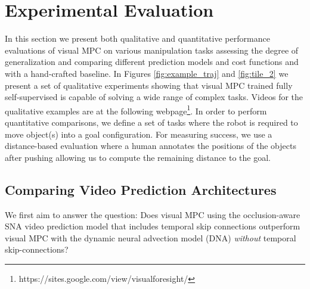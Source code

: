 \section{Experimental Evaluation}
\label{sec:experiments}
In this section we present both qualitative and quantitative  performance evaluations of visual MPC on various manipulation tasks assessing the degree of generalization and comparing different prediction models and cost functions and with a hand-crafted baseline.
In Figures \ref{fig:example_traj} and \ref{fig:tile_2} we present a set of qualitative experiments showing that visual MPC trained fully self-supervised is capable of solving a wide range of complex tasks.
Videos for the qualitative examples are at the following webpage\footnote{https://sites.google.com/view/visualforesight/}.
In order to perform quantitative comparisons, we define a set of tasks where the robot is required to move object(s) into a goal configuration. For measuring success, we use a distance-based evaluation where a human annotates the positions of the objects after pushing allowing us to compute the remaining distance to the goal.

\subsection{Comparing Video Prediction Architectures}
\label{subsec:sna_experiments}
We first aim to answer the question: Does  visual MPC using the occlusion-aware SNA video prediction model that includes temporal skip connections outperform visual MPC with the dynamic neural advection model (DNA)\cite{foresight} \emph{without} temporal skip-connections?

